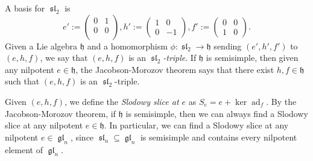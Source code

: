 \documentclass[12pt,psamsfonts]{article}
\DeclareMathOperator{\gl}{\mathfrak{gl}}
\DeclareMathOperator{\spl}{\mathfrak{sl}}
\DeclareMathOperator{\ad}{ad}
\begin{document}
A basis for \(\spl_2\) is
\[e' := \begin{pmatrix}0 & 1 \\ 0 & 0 \\\end{pmatrix}, h' := \begin{pmatrix}1 & 0 \\0 & -1\end{pmatrix}, f' := \begin{pmatrix}0 & 0 \\1 & 0\end{pmatrix}.\]
Given a Lie algebra \(\mathfrak{h}\) and a homomorphism \(\phi : \spl_2 \to \mathfrak{h}\) sending \((e', h', f')\) to \((e, h, f)\), we say that \((e, h, f)\) is an \emph{\(\spl_2\)-triple}.
If \(\mathfrak{h}\) is semisimple, then given any nilpotent \(e \in \mathfrak{h}\), the Jacobson-Morozov theorem \cite[3.7.1]{ehf} says that there exist \(h, f \in \mathfrak{h}\) such that \((e, h, f)\) is an \(\spl_2\)-triple.
\par Given \((e, h, f)\), we define the \emph{Slodowy slice at \(e\)} as \(S_e = e + \ker \ad_f\).
By the Jacobson-Morozov theorem, if \(\mathfrak{h}\) is semisimple, then we can always find a Slodowy slice at any nilpotent \(e \in \mathfrak{h}\).
In particular, we can find a Slodowy slice at any nilpotent \(e \in \gl_n\), since \(\spl_n \subseteq \gl_n\) is semisimple and contains every nilpotent element of \(\gl_n\).
\end{document}
